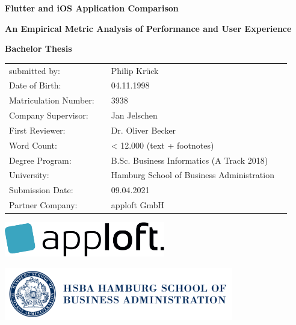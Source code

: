 \thispagestyle{empty}                  %


\begin{center}                         

\textbf{\Huge Flutter and iOS Application Comparison}

\textbf{\large An Empirical Metric Analysis of Performance and User Experience}

\vspace{5cm}

\textbf{\huge Bachelor Thesis}

\vspace{2cm}



\large\centering\doublespacing
\hspace{1.3cm}\begin{tabular}{p{4.2cm}p{0.3cm} p{8.7cm}l}
submitted by: & & Philip Krück\\
Date of Birth: & & 04.11.1998\\
Matriculation Number: & & 3938\\
Company Supervisor: & & Jan Jelschen\\
First Reviewer: & & Dr. Oliver Becker\\
Word Count: & & < 12.000 (text + footnotes) \\
Degree Program: & & B.Sc. Business Informatics (A Track 2018)\\
University: & & Hamburg School of Business Administration\\
Submission Date: & & 09.04.2021\\
Partner Company: & & apploft GmbH\\
\end{tabular}


\vspace{2cm}

\includegraphics[width=7cm]{images/apploft.png} %

\vspace{0.5cm}

\includegraphics[width=10cm]{images/hsba.png} %

\end{center}
